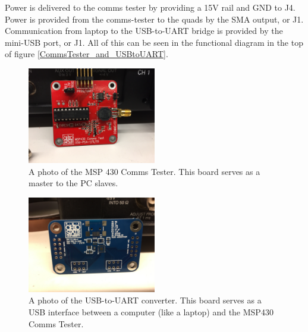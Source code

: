 \documentclass[letter,12pt]{article}
\begin{document}
Power is delivered to the comms tester by providing a 15V rail and GND to J4. Power is provided from the comms-tester to the quads by the SMA output, or J1. Communication from laptop to the USB-to-UART bridge is provided by the mini-USB port, or J1. All of this can be seen in the functional diagram in the top of figure \ref{CommsTester_and_USBtoUART}.

\begin{figure}
\begin{centering}
\includegraphics[width=0.5\textwidth]{photos/MS430_CommsTester.jpg}
\par\end{centering}
\caption{A photo of the MSP 430 Comms Tester. This board serves as a master
to the PC slaves. }
\label{comms-tester}
\end{figure}

\begin{figure}
\begin{centering}
\includegraphics[width=0.5\textwidth]{photos/USB-to-UART.jpg}
\par\end{centering}
\caption{A photo of the USB-to-UART converter. This board serves as a USB interface
between a computer (like a laptop) and the MSP430 Comms Tester.}
\label{USB-to-UART}
\end{figure}
\end{document}
